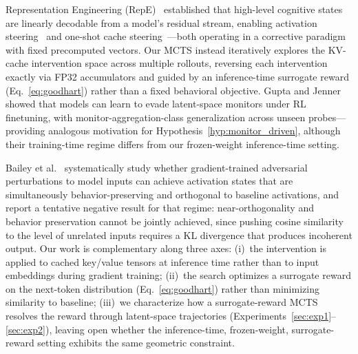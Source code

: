 \documentclass{article}
\begin{document}
Representation Engineering (RepE)~\cite{zou2023repe} established that high-level cognitive states are linearly decodable from a model's residual stream, enabling activation steering~\cite{turner2023steering} and one-shot cache steering~\cite{belitsky2025kvcache}---both operating in a corrective paradigm with fixed precomputed vectors. Our MCTS instead iteratively explores the KV-cache intervention space across multiple rollouts, reversing each intervention exactly via FP32 accumulators and guided by an inference-time surrogate reward (Eq.~\ref{eq:goodhart}) rather than a fixed behavioral objective. Gupta and Jenner~\cite{gupta2025rlobfuscation} showed that models can learn to evade latent-space monitors under RL finetuning, with monitor-aggregation-class generalization across unseen probes---providing analogous motivation for Hypothesis~\ref{hyp:monitor_driven}, although their training-time regime differs from our frozen-weight inference-time setting.

Bailey et al.~\cite{bailey2024obfuscated} systematically study whether gradient-trained adversarial perturbations to model inputs can achieve activation states that are simultaneously behavior-preserving and orthogonal to baseline activations, and report a tentative negative result for that regime: near-orthogonality and behavior preservation cannot be jointly achieved, since pushing cosine similarity to the level of unrelated inputs requires a KL divergence that produces incoherent output. Our work is complementary along three axes: (i)~the intervention is applied to cached key/value tensors at inference time rather than to input embeddings during gradient training; (ii)~the search optimizes a surrogate reward on the next-token distribution (Eq.~\ref{eq:goodhart}) rather than minimizing similarity to baseline; (iii)~we characterize how a surrogate-reward MCTS resolves the reward through latent-space trajectories (Experiments~\ref{sec:exp1}--\ref{sec:exp2}), leaving open whether the inference-time, frozen-weight, surrogate-reward setting exhibits the same geometric constraint.
\end{document}
